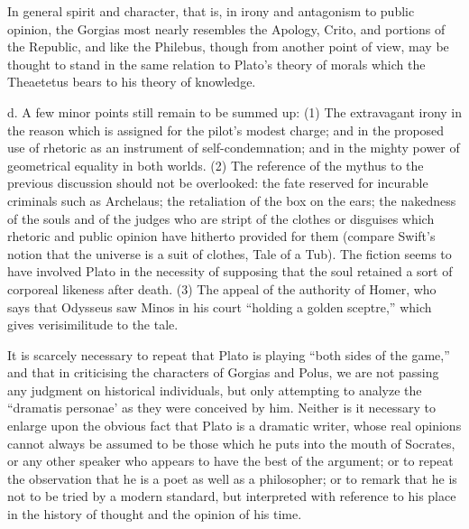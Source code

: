 \documentclass[11pt,letter]{article}
\begin{document}
\par  In general spirit and character, that is, in irony and antagonism to public opinion, the Gorgias most nearly resembles the Apology, Crito, and portions of the Republic, and like the Philebus, though from another point of view, may be thought to stand in the same relation to Plato’s theory of morals which the Theaetetus bears to his theory of knowledge.

\par  d. A few minor points still remain to be summed up: (1) The extravagant irony in the reason which is assigned for the pilot’s modest charge; and in the proposed use of rhetoric as an instrument of self-condemnation; and in the mighty power of geometrical equality in both worlds. (2) The reference of the mythus to the previous discussion should not be overlooked: the fate reserved for incurable criminals such as Archelaus; the retaliation of the box on the ears; the nakedness of the souls and of the judges who are stript of the clothes or disguises which rhetoric and public opinion have hitherto provided for them (compare Swift’s notion that the universe is a suit of clothes, Tale of a Tub). The fiction seems to have involved Plato in the necessity of supposing that the soul retained a sort of corporeal likeness after death. (3) The appeal of the authority of Homer, who says that Odysseus saw Minos in his court “holding a golden sceptre,” which gives verisimilitude to the tale.

\par  It is scarcely necessary to repeat that Plato is playing “both sides of the game,” and that in criticising the characters of Gorgias and Polus, we are not passing any judgment on historical individuals, but only attempting to analyze the “dramatis personae’ as they were conceived by him. Neither is it necessary to enlarge upon the obvious fact that Plato is a dramatic writer, whose real opinions cannot always be assumed to be those which he puts into the mouth of Socrates, or any other speaker who appears to have the best of the argument; or to repeat the observation that he is a poet as well as a philosopher; or to remark that he is not to be tried by a modern standard, but interpreted with reference to his place in the history of thought and the opinion of his time.
\end{document}
